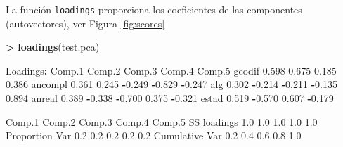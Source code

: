 \documentclass[
  a4paper,
  oneside]{scrbook}
\newenvironment{Shaded}{\begin{snugshade}}{\end{snugshade}}
\newcommand{\FloatTok}[1]{\textcolor[rgb]{0.00,0.00,0.81}{#1}}
\newcommand{\FunctionTok}[1]{\textcolor[rgb]{0.13,0.29,0.53}{\textbf{#1}}}
\newcommand{\NormalTok}[1]{#1}
\newcommand{\SpecialCharTok}[1]{\textcolor[rgb]{0.81,0.36,0.00}{\textbf{#1}}}
\theoremstyle{definition}
\theoremstyle{definition}
\theoremstyle{definition}
\theoremstyle{definition}
\theoremstyle{remark}
\begin{document}
La función \texttt{loadings} proporciona los coeficientes de las componentes (autovectores), ver Figura
\ref{fig:scores}

\footnotesize

\begin{Shaded}
\begin{Highlighting}[]
\SpecialCharTok{\textgreater{}} \FunctionTok{loadings}\NormalTok{(test.pca)}

\NormalTok{Loadings}\SpecialCharTok{:}
\NormalTok{        Comp}\FloatTok{.1}\NormalTok{ Comp}\FloatTok{.2}\NormalTok{ Comp}\FloatTok{.3}\NormalTok{ Comp}\FloatTok{.4}\NormalTok{ Comp}\FloatTok{.5}
\NormalTok{geodif   }\FloatTok{0.598}  \FloatTok{0.675}  \FloatTok{0.185}  \FloatTok{0.386}       
\NormalTok{ancompl  }\FloatTok{0.361}  \FloatTok{0.245} \SpecialCharTok{{-}}\FloatTok{0.249} \SpecialCharTok{{-}}\FloatTok{0.829} \SpecialCharTok{{-}}\FloatTok{0.247}
\NormalTok{alg      }\FloatTok{0.302} \SpecialCharTok{{-}}\FloatTok{0.214} \SpecialCharTok{{-}}\FloatTok{0.211} \SpecialCharTok{{-}}\FloatTok{0.135}  \FloatTok{0.894}
\NormalTok{anreal   }\FloatTok{0.389} \SpecialCharTok{{-}}\FloatTok{0.338} \SpecialCharTok{{-}}\FloatTok{0.700}  \FloatTok{0.375} \SpecialCharTok{{-}}\FloatTok{0.321}
\NormalTok{estad    }\FloatTok{0.519} \SpecialCharTok{{-}}\FloatTok{0.570}  \FloatTok{0.607}        \SpecialCharTok{{-}}\FloatTok{0.179}

\NormalTok{               Comp}\FloatTok{.1}\NormalTok{ Comp}\FloatTok{.2}\NormalTok{ Comp}\FloatTok{.3}\NormalTok{ Comp}\FloatTok{.4}\NormalTok{ Comp}\FloatTok{.5}
\NormalTok{SS loadings       }\FloatTok{1.0}    \FloatTok{1.0}    \FloatTok{1.0}    \FloatTok{1.0}    \FloatTok{1.0}
\NormalTok{Proportion Var    }\FloatTok{0.2}    \FloatTok{0.2}    \FloatTok{0.2}    \FloatTok{0.2}    \FloatTok{0.2}
\NormalTok{Cumulative Var    }\FloatTok{0.2}    \FloatTok{0.4}    \FloatTok{0.6}    \FloatTok{0.8}    \FloatTok{1.0}
\end{Highlighting}
\end{Shaded}

\normalsize

\footnotesize
\end{document}
